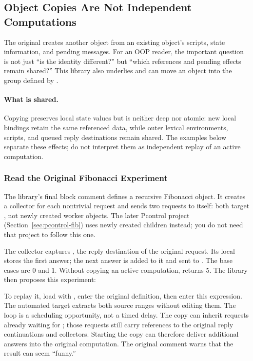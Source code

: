 \subsection{Object Copies Are Not Independent Computations}
\label{sec:copy}

The original  creates another object from an
existing object's scripts, state information, and pending messages.
For an OOP reader, the important question is not just ``is the identity
different?'' but ``which references and pending effects remain shared?''
This library also underlies  and can move an object into
the  group defined by .

\paragraph{What is shared.}
Copying preserves local state values but is neither deep nor atomic: new local bindings retain the
same referenced data, while outer lexical environments, scripts, and queued
reply destinations remain shared. The examples below separate these effects;
do not interpret them as independent replay of an active computation.

\subsubsection{Read the Original Fibonacci Experiment}

The library's final block comment defines a recursive Fibonacci object.
It creates a collector for each nontrivial request and sends two requests
to itself: both target , not newly created worker objects.
The later Pcontrol project (Section~\ref{sec:pcontrol-fib}) uses newly
created children instead; you do not need that project to follow this one.


The collector captures , the reply destination of the original
request. Its local  stores the first answer; the next
answer is added to it and sent to . The base cases are 0 and 1.
Without copying an active computation, \code{[fib <== 5]} returns 5.
The library then proposes this experiment:


To replay it, load  with , enter the
original  definition, then enter this expression. The automated
 target extracts both source ranges without editing them.
The  loop is a scheduling opportunity, not a timed delay.
The copy can inherit requests already waiting for ; those
requests still carry references to the original reply continuations and
collectors. Starting the copy can therefore deliver additional answers
into the original computation. The original comment warns that the result
can seem ``funny.''

